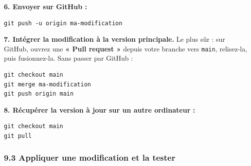 \documentclass[
  french,
  11pt,
  a4paper,
]{article}
\begin{document}
\textbf{6. Envoyer sur GitHub :}

\begin{Verbatim}[breaklines=true,breakanywhere=true,fontsize=\small,frame=leftline,framerule=1.6pt,rulecolor=\color{credixblue},framesep=3mm,xleftmargin=2mm,xrightmargin=1mm]
git push -u origin ma-modification
\end{Verbatim}

\textbf{7. Intégrer la modification à la version principale.} Le plus
sûr : sur GitHub, ouvrez une \textbf{« Pull request »} depuis votre
branche vers \texttt{main}, relisez-la, puis fusionnez-la. Sans passer
par GitHub :

\begin{Verbatim}[breaklines=true,breakanywhere=true,fontsize=\small,frame=leftline,framerule=1.6pt,rulecolor=\color{credixblue},framesep=3mm,xleftmargin=2mm,xrightmargin=1mm]
git checkout main
git merge ma-modification
git push origin main
\end{Verbatim}

\textbf{8. Récupérer la version à jour sur un autre ordinateur :}

\begin{Verbatim}[breaklines=true,breakanywhere=true,fontsize=\small,frame=leftline,framerule=1.6pt,rulecolor=\color{credixblue},framesep=3mm,xleftmargin=2mm,xrightmargin=1mm]
git checkout main
git pull
\end{Verbatim}

\subsubsection{9.3 Appliquer une modification et la
tester}\label{93-appliquer-une-modification-et-la-tester}
\end{document}
